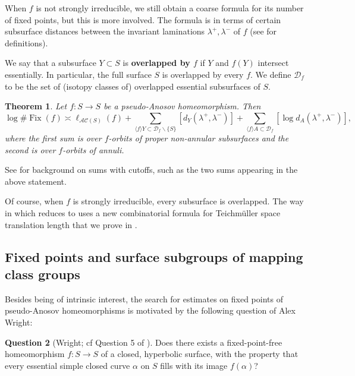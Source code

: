 \documentclass[11pt,letterpaper]{amsart}
\newcommand{\mc}{\mathcal}
\newcommand{\Fix}{\operatorname{Fix}}
\numberwithin{equation}{section}
\newtheorem{theorem}{Theorem}[section]
\theoremstyle{definition}
\newtheorem{question}[theorem]{Question}
\newcommand{\define}[1]{\textbf{#1}}
\renewcommand{\setminus}{\smallsetminus}
\newcommand{\AC}{\mathcal{AC}}
\begin{document}
When $f$ is not strongly irreducible, we still obtain a coarse formula for its number of fixed points, but this is more involved. The formula is in terms of 
certain subsurface distances between the invariant laminations $\lambda^+, \lambda^-$ of $f$ (see  for definitions). 

We say that a subsurface $Y \subset S$ is \define{overlapped by $f$}  if $Y$ and $f(Y)$ intersect essentially. In particular, the full surface $S$ is overlapped by every $f$.
We define $\mc D_f$ to be the set of (isotopy classes of) overlapped essential subsurfaces of $S$. 

\begin{theorem}\label{th:main_2}
Let $f \colon S \to S$ be a pseudo-Anosov homeomorphism. 
Then 
\[
\log \# \Fix(f) \asymp \ell_{\AC(S)}(f) +  \sum_{\langle f \rangle Y \subset \mc D_f \setminus \{ S \}} [d_Y(\lambda^+,\lambda^-)] + \sum_{\langle f \rangle A \subset  \mc D_f} [\log d_A(\lambda^+,\lambda^-)],
\]
where the first sum is over $f$-orbits of proper non-annular subsurfaces and the second is over $f$-orbits of annuli. 
\end{theorem}

See  for background on sums with cutoffs, such as the two sums appearing in the above statement.


Of course, when $f$ is strongly irreducible, every subsurface is overlapped. The way in which  reduces to  uses a new combinatorial formula for Teichm\"uller space translation length 
that we prove in .


\subsection*{Fixed points and surface subgroups of mapping class groups}

Besides being of  intrinsic interest, the search for estimates on fixed points of pseudo-Anosov homeomorphisms is motivated by the following question
 of Alex Wright:

\begin{question}[Wright; cf Question 5 of \cite{KentLeininger:AtoroidalBundles}]
\label{Ques:Wright}
Does there exists a fixed-point-free homeomorphism $f \colon S \to S$ of a closed, hyperbolic surface, with the property that every essential simple closed curve $\alpha$ on $S$ fills with its image $f(\alpha)$?
\end{question}
\end{document}
